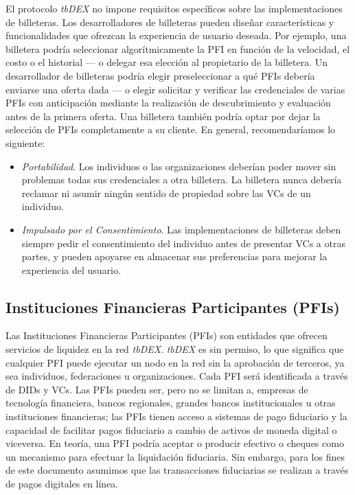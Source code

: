 \documentclass[11pt]{article}
\begin{document}
\vspace{1\baselineskip}
El protocolo \textit{tbDEX} no impone requisitos específicos sobre las implementaciones de billeteras. Los desarrolladores de billeteras pueden diseñar características y funcionalidades que ofrezcan la experiencia de usuario deseada. Por ejemplo, una billetera podría seleccionar algorítmicamente la PFI en función de la velocidad, el costo o el historial — o delegar esa elección al propietario de la billetera. Un desarrollador de billeteras podría elegir preseleccionar a qué PFIs debería enviarse una oferta dada — o elegir solicitar y verificar las credenciales de varias PFIs con anticipación mediante la realización de descubrimiento y evaluación antes de la primera oferta. Una billetera también podría optar por dejar la selección de PFIs completamente a su cliente. En general, recomendaríamos lo siguiente:

\begin{itemize}
	\item \textit{Portabilidad}. Los individuos o las organizaciones deberían poder mover sin problemas todas sus credenciales a otra billetera. La billetera nunca debería reclamar ni asumir ningún sentido de propiedad sobre las VCs de un individuo.

	\item \textit{Impulsado por el Consentimiento}. Las implementaciones de billeteras deben siempre pedir el consentimiento del individuo antes de presentar VCs a otras partes, y pueden apoyarse en almacenar sus preferencias para mejorar la experiencia del usuario.

\end{itemize}
\subsection{Instituciones Financieras Participantes (PFIs)}

\vspace{1\baselineskip}
Las Instituciones Financieras Participantes (PFIs) son entidades que ofrecen servicios de liquidez en la red \textit{tbDEX}. \textit{tbDEX} es sin permiso, lo que significa que cualquier PFI puede ejecutar un nodo en la red sin la aprobación de terceros, ya sea individuos, federaciones u organizaciones. Cada PFI será identificada a través de DIDs y VCs. Las PFIs pueden ser, pero no se limitan a, empresas de tecnología financiera, bancos regionales, grandes bancos institucionales u otras instituciones financieras; las PFIs tienen acceso a sistemas de pago fiduciario y la capacidad de facilitar pagos fiduciario a cambio de activos de moneda digital o viceversa. En teoría, una PFI podría aceptar o producir efectivo o cheques como un mecanismo para efectuar la liquidación fiduciaria. Sin embargo, para los fines de este documento asumimos que las transacciones fiduciarias se realizan a través de pagos digitales en línea.
\end{document}
